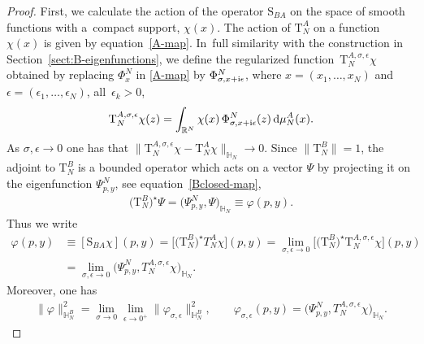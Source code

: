 \begin{proof}
First, we calculate the action of the operator $\mathrm S_{BA}$ on the space of smooth functions with a~com\-pact support, $\chi(x)$. The
action of $\mathrm T_N^A$ on a function $\chi(x)$ is given by equation~\eqref{A-map}. In~full similarity with the construction in
Section~\ref{sect:B-eigenfunctions}, we define the regularized function~$\mathrm T_N^{A,\sigma,\epsilon}\chi$ obtained by replacing
$\Phi^N_{x}$ in \eqref{A-map} by $\Phi^N_{\sigma,x+{\rm i}\epsilon}$, where $x=(x_1,\dots,x_N)$ and $\epsilon=(\epsilon_1,\dots,\epsilon_N)$,
all~$\epsilon_k>0$,
\begin{gather}\label{A-map-reg}
\mathrm T_N^{A,\sigma,\epsilon}\chi(z)=\int_{\mathbb R^{N}} \chi( x)\, \Phi^N_{{\sigma,x+{\rm i}\epsilon}}( z)\, {\rm d}\mu_{N}^{A}( x).
\end{gather}
As $\sigma,\epsilon\to 0$ one has that $\big\|\mathrm T_N^{A,\sigma,\epsilon}\chi - \mathrm T_N^{A}\chi \big\|_{\mathbb H_N} \to 0$.
Since $\|\mathrm T_N^B\|=1$, the adjoint to $\mathrm T_N^B$ is a bounded operator which acts on a vector $\Psi$ by projecting it on the
eigenfunction $\Psi^N_{p,y}$, see equation~\eqref{Bclosed-map},
\begin{gather*}
\big(\mathrm T_N^B\big)^\star \Psi =\big(\Psi^N_{p,y},\Psi\big)_{\mathbb H_N} \equiv \varphi(p,y).
\end{gather*}
Thus we write
\begin{align*}
\varphi(p,y)&\equiv [\mathrm S_{BA}\chi](p,y)= \big[ \big(\mathrm T_N^B\big)^\star T_N^{A}\chi \big](p,y)
=\lim_{\sigma,\epsilon\to 0} \big[ \big(\mathrm T_N^B\big)^\star \mathrm T_N^{A,\sigma,\epsilon}\chi \big](p,y)
\\
& =\lim_{\sigma,\epsilon\to 0}\big( \Psi^N_{p,y} , T_N^{A,\sigma,\epsilon}\chi \big)_{\mathbb H_N}.
\end{align*}
Moreover, one has
\begin{gather}\label{varphi-def-and-norm}
\|\varphi\|^2_{\mathbb H_N^{B}}=\lim_{\sigma\to 0}\lim_{\epsilon\to0^+}\|\varphi_{\sigma,\epsilon}\|^2_{\mathbb H_N^{B}}, \qquad
\varphi_{\sigma,\epsilon}(p,y) = \big( \Psi^N_{p,y},T_N^{A,\sigma,\epsilon}\chi \big)_{\mathbb H_N}.
\end{gather}


\end{proof}
